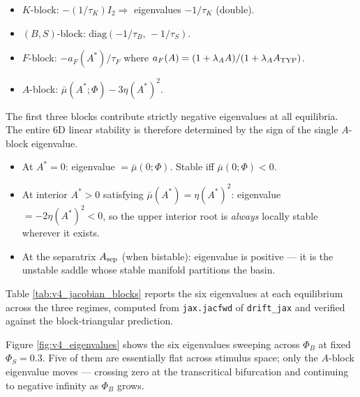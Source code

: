 \begin{itemize}
  \item $K$-block: $-(1/\tau_K) I_2 \Rightarrow$ eigenvalues $-1/\tau_K$ (double).
  \item $(B, S)$-block: $\mathrm{diag}(-1/\tau_B,\,-1/\tau_S)$.
  \item $F$-block: $-a_F(A^*)/\tau_F$ where $a_F(A) = (1+\lambda_A A)/(1+\lambda_A A_{\rm TYP})$.
  \item $A$-block: $\bar\mu(A^*; \Phi) - 3\eta (A^*)^2$.
\end{itemize}

The first three blocks contribute strictly negative eigenvalues at all equilibria. The entire 6D linear stability is therefore determined by the sign of the single $A$-block eigenvalue.

\begin{itemize}
  \item At $A^* = 0$: eigenvalue $= \bar\mu(0; \Phi)$. Stable iff $\bar\mu(0; \Phi) < 0$.
  \item At interior $A^* > 0$ satisfying $\bar\mu(A^*) = \eta(A^*)^2$: eigenvalue $= -2\eta (A^*)^2 < 0$, so the upper interior root is \emph{always} locally stable wherever it exists.
  \item At the separatrix $A_{\rm sep}$ (when bistable): eigenvalue is positive --- it is the unstable saddle whose stable manifold partitions the basin.
\end{itemize}

Table \ref{tab:v4_jacobian_blocks} reports the six eigenvalues at each equilibrium across the three regimes, computed from \texttt{jax.jacfwd} of \texttt{drift\_jax} and verified against the block-triangular prediction.

\begin{table}[h]
    \centering
    \scriptsize
    
    \caption{Real parts of the six Jacobian eigenvalues at each equilibrium across the three regimes. Computed via automatic differentiation of \texttt{drift\_jax}; agreement with the analytical prediction (the smallest eigenvalue in magnitude is always the $A$-block) is exact within machine precision.}
    \label{tab:v4_jacobian_blocks}
\end{table}

Figure \ref{fig:v4_eigenvalues} shows the six eigenvalues sweeping across $\Phi_B$ at fixed $\Phi_S = 0.3$. Five of them are essentially flat across stimulus space; only the $A$-block eigenvalue moves --- crossing zero at the transcritical bifurcation and continuing to negative infinity as $\Phi_B$ grows.

